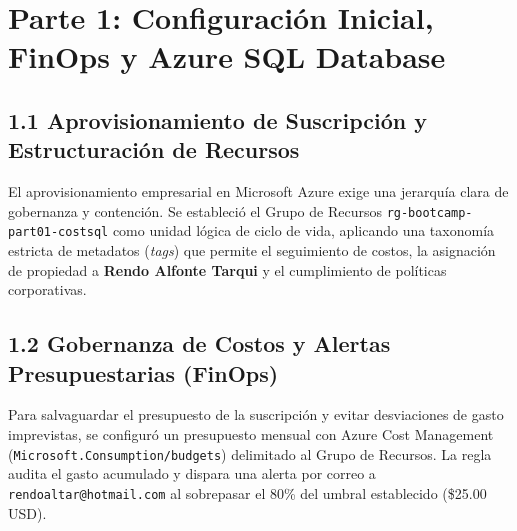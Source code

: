 \section{Parte 1: Configuración Inicial, FinOps y Azure SQL Database}

\subsection{1.1 Aprovisionamiento de Suscripción y Estructuración de Recursos}
El aprovisionamiento empresarial en Microsoft Azure exige una jerarquía clara de gobernanza y contención. Se estableció el Grupo de Recursos \texttt{rg-bootcamp-part01-costsql} como unidad lógica de ciclo de vida, aplicando una taxonomía estricta de metadatos (\textit{tags}) que permite el seguimiento de costos, la asignación de propiedad a \textbf{Rendo Alfonte Tarqui} y el cumplimiento de políticas corporativas.


\subsection{1.2 Gobernanza de Costos y Alertas Presupuestarias (FinOps)}
Para salvaguardar el presupuesto de la suscripción y evitar desviaciones de gasto imprevistas, se configuró un presupuesto mensual con Azure Cost Management (\texttt{Microsoft.Consumption/budgets}) delimitado al Grupo de Recursos. La regla audita el gasto acumulado y dispara una alerta por correo a \texttt{rendoaltar@hotmail.com} al sobrepasar el 80\% del umbral establecido (\$25.00 USD).

